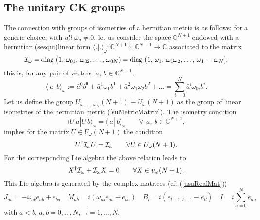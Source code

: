 \documentclass[12pt]{article}
\begin{document}
\subsection{The unitary CK groups}

The connection with groups of isometries of a hermitian metric is as
follows: for a generic choice, with \emph{all} ${\omega}_a \neq 0$, let us
consider the space ${{\mathbb C}}^{N+1}$ endowed with a hermitian
(sesqui)linear form $\langle .|. \rangle_{\omega} : {{\mathbb C}}^{N+1}\times
{{\mathbb C}}^{N+1}\to  {{\mathbb C}}$ associated to the matrix
\begin{equation}
{{{\cal I}_{\omega}}} = {\mbox{diag}}\ (1,\, {\omega}_{01},\,{\omega}_{02},\dots,\,{\omega}_{0N}) =
       {\mbox{diag}}\ (1,\, {\omega}_1,\,{\omega}_1{\omega}_2,\dots,\,{\omega}_1\cdots{\omega}_N);
\label{suMetricMatrix}
\end{equation}
this is, for any pair of vectors $\>a,\>b\in {{\mathbb C}}^{N+1}$,
\begin{equation}
\langle \>a|\>b \rangle_{\omega}:=
\bar a^0 b^0 + \bar a^1 {\omega}_1 b^1 + \bar a^2 {\omega}_1 {\omega}_2 b^2 + \dots =
\sum_{i=0}^N \bar a^i{\omega}_{0i}  b^i.
\label{ai}
\end{equation}
Let us define the group $U_{{\omega}_1,\dots,{\omega}_N}(N+1)\equiv
U_{\omega}(N+1)$ as the group of linear isometries of
the hermitian metric (\ref{suMetricMatrix}). The isometry
condition
\begin{equation}
\langle U \>a| U \>b \rangle_{\omega}= \langle \>a|  \>b \rangle_{\omega}
\qquad \forall\, \>a,\>b\in {{\mathbb C}}^{N+1},
\label{aj}
\end{equation}
implies for the matrix
$U \in U_{\omega}(N+1)$ the condition
\begin{equation}
U^\dagger{{{\cal I}_{\omega}}} U={{{\cal I}_{\omega}}}  \qquad
\forall U\in U_{\omega}(N+1).
\label{ak}
\end{equation}
For the corresponding Lie algebra the above relation leads to
\begin{equation}
X^\dagger{{{\cal I}_{\omega}}} +{{{\cal I}_{\omega}}} X=0  \qquad
\forall X\in  u_{\omega}(N+1).
\label{ag}
\end{equation}
This Lie algebra is generated by
the complex matrices (cf. (\ref{usuRealMat}))
\begin{equation}
{J}_{ab}=-{\omega}_{ab}e_{ab}+e_{ba}  \quad
{M}_{ab}=i({\omega}_{ab}e_{ab}+e_{ba})  \quad
{B}_l=i(e_{l-1,l-1}-e_{ll})  \quad
{I}=i \sum_{a=0}^{N}e_{aa}
\label{CKusuRealMat}
\end{equation}
with $a<b$, $a,b=0,\dots,N$, \ $l=1,\dots,N$.
\end{document}
